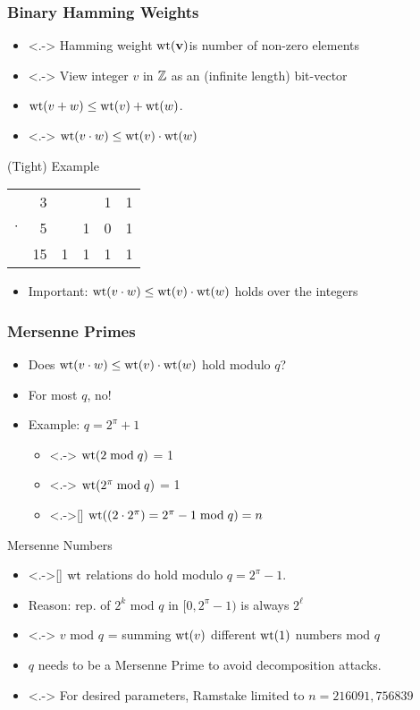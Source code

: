 \documentclass[11pt,t,xcolor=pdftex,svgnames,handout]{beamer}
\begin{document}
\begin{frame}    
    \frametitle{Binary Hamming Weights}
\begin{itemize}
\item<.-> Hamming weight $\operatorname*{wt}(\mathbf{v})$is number of non-zero
  elements
\smallskip
\item<.-> View integer $v$ in $\mathbb{Z}$ as an (infinite length) bit-vector
\smallskip
\item<+-> $\operatorname*{wt}(v + w) \leq \operatorname*{wt}(v)+\operatorname*{wt}(w)$.
\smallskip
\item<.-> $\operatorname*{wt}(v \cdot w ) \leq \operatorname*{wt}(v) \cdot \operatorname*{wt}(w)$
\end{itemize}
\onslide<+->
\begin{block}{(Tight) Example}
\begin{table}
\begin{tabular}{cr|cccc}
&3&&&1&1\\
$\cdot$&5&&1&0&1\\
\hline
&15&1&1&1&1\\
\end{tabular}
\end{table}
\end{block}
\begin{itemize}
\item<+-> Important: $\operatorname*{wt}(v \cdot w ) \leq \operatorname*{wt}(v) \cdot
  \operatorname*{wt}(w)$ holds \alert{over the integers}
\end{itemize}
\end{frame}
\begin{frame}
  \frametitle{Mersenne Primes}
\begin{itemize}
\item<+-> Does $\operatorname*{wt}(v \cdot w) \leq \operatorname*{wt}(v) \cdot \operatorname*{wt}(w)$ hold modulo $q$?
\item<+->[\RedCross] For most $q$, no!
\item<+-> Example: $q=2^{\pi}+1$
\begin{itemize}
\item<.-> $\operatorname*{wt}(2 \bmod{q})$ = 1
\item<.-> $\operatorname*{wt}(2^{\pi} \bmod{q})$ = 1
\item<.->[\RedCross] $\operatorname*{wt}((2\cdot 2^{\pi}) = 2^{\pi}-1 \bmod{q})=n$ 
\end{itemize}
\end{itemize} 
\onslide<+->
\begin{block}{Mersenne Numbers}
\begin{itemize}
\item<.->[\GreenCheck] $\operatorname*{wt}$ relations do hold modulo $q=2^{\pi}-1$. 
\item<+-> Reason: rep. of $2^{k}$ mod $q$  in $[0,2^{\pi}-1)$ is always
$2^{\ell}$
\item<.-> $v$ mod $q$ = summing $\operatorname*{wt}(v)$ different $\operatorname*{wt}(1)$
  numbers mod $q$
\item<+->  $q$ needs to be a \alert{Mersenne Prime} to avoid
  decomposition attacks.
\item[\RedCross]<.-> For desired parameters, Ramstake limited to $n=216091,756839$
\end{itemize}
\end{block}
\end{frame}
\end{document}
